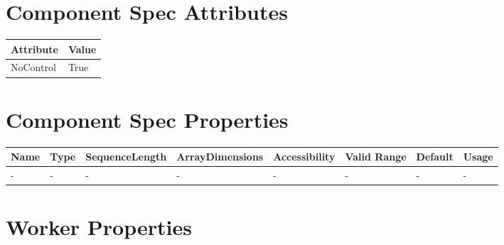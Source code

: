 \documentclass{article}
\begin{document}
\begin{landscape}

	\section*{Component Spec Attributes}
	\begin{scriptsize}
		\begin{tabular}{|p{3.75cm}|p{19.34cm}|}
			\hline
			\rowcolor{blue}
			Attribute & Value \\
			\hline
			NoControl & True \\
			\hline
		\end{tabular}
	\end{scriptsize}

	\section*{Component Spec Properties}
	\begin{scriptsize}
		\begin{tabular}{|p{3.75cm}|p{1.25cm}|p{2cm}|p{2.75cm}|p{1.5cm}|p{1.5cm}|p{1cm}|p{6.74cm}|}
			\hline
			\rowcolor{blue}
			Name               & Type & SequenceLength & ArrayDimensions & Accessibility      & Valid Range & Default & Usage                                                                               \\
			\hline
			- & - & - & - & - & - & - & - \\
			\hline
		\end{tabular}
	\end{scriptsize}

	\section*{Worker Properties}

\end{landscape}
\end{document}
